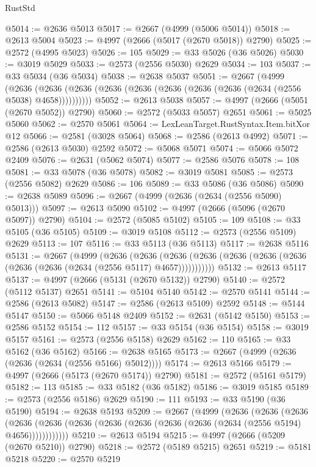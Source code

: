 \begin{lexlean}{RustStd}
\begin{coremodule}
@5014 := @2636 @5013
@5017 := @2667 (@4999 (@5006 @5014))
@5018 := @2613 @5004
@5023 := @4997 (@2666 (@5017 (@2670 @5018)) @2790)
@5025 := @2572 (@4995 @5023)
@5026 := 105
@5029 := @33 @5026 (@36 @5026)
@5030 := @3019 @5029
@5033 := @2573 (@2556 @5030) @2629
@5034 := 103
@5037 := @33 @5034 (@36 @5034)
@5038 := @2638 @5037
@5051 := @2667
    (@4999
      (@2636 (@2636 (@2636 (@2636 (@2636 (@2636 (@2636 (@2636 (@2634 (@2556 @5038) @4658))))))))))
@5052 := @2613 @5038
@5057 := @4997 (@2666 (@5051 (@2670 @5052)) @2790)
@5060 := @2572 (@5033 @5057) @2651
@5061 := @5025 @5060
@5062 := @2570 @5061
@5064 := LexLeanTarget.RustSyntax.Item.bitXor @12
@5066 := @2581 (@3028 @5064)
@5068 := @2586 (@2613 @4992)
@5071 := @2586 (@2613 @5030) @2592
@5072 := @5068 @5071
@5074 := @5066 @5072 @2409
@5076 := @2631 (@5062 @5074)
@5077 := @2586 @5076
@5078 := 108
@5081 := @33 @5078 (@36 @5078)
@5082 := @3019 @5081
@5085 := @2573 (@2556 @5082) @2629
@5086 := 106
@5089 := @33 @5086 (@36 @5086)
@5090 := @2638 @5089
@5096 := @2667 (@4999 (@2636 (@2634 (@2556 @5090) @5013)))
@5097 := @2613 @5090
@5102 := @4997 (@2666 (@5096 (@2670 @5097)) @2790)
@5104 := @2572 (@5085 @5102)
@5105 := 109
@5108 := @33 @5105 (@36 @5105)
@5109 := @3019 @5108
@5112 := @2573 (@2556 @5109) @2629
@5113 := 107
@5116 := @33 @5113 (@36 @5113)
@5117 := @2638 @5116
@5131 := @2667
    (@4999
      (@2636
        (@2636
          (@2636 (@2636 (@2636 (@2636 (@2636 (@2636 (@2636 (@2634 (@2556 @5117) @4657)))))))))))
@5132 := @2613 @5117
@5137 := @4997 (@2666 (@5131 (@2670 @5132)) @2790)
@5140 := @2572 (@5112 @5137) @2651
@5141 := @5104 @5140
@5142 := @2570 @5141
@5144 := @2586 (@2613 @5082)
@5147 := @2586 (@2613 @5109) @2592
@5148 := @5144 @5147
@5150 := @5066 @5148 @2409
@5152 := @2631 (@5142 @5150)
@5153 := @2586 @5152
@5154 := 112
@5157 := @33 @5154 (@36 @5154)
@5158 := @3019 @5157
@5161 := @2573 (@2556 @5158) @2629
@5162 := 110
@5165 := @33 @5162 (@36 @5162)
@5166 := @2638 @5165
@5173 := @2667 (@4999 (@2636 (@2636 (@2634 (@2556 @5166) @5012))))
@5174 := @2613 @5166
@5179 := @4997 (@2666 (@5173 (@2670 @5174)) @2790)
@5181 := @2572 (@5161 @5179)
@5182 := 113
@5185 := @33 @5182 (@36 @5182)
@5186 := @3019 @5185
@5189 := @2573 (@2556 @5186) @2629
@5190 := 111
@5193 := @33 @5190 (@36 @5190)
@5194 := @2638 @5193
@5209 := @2667
    (@4999
      (@2636
        (@2636
          (@2636
            (@2636 (@2636 (@2636 (@2636 (@2636 (@2636 (@2636 (@2634 (@2556 @5194) @4656))))))))))))
@5210 := @2613 @5194
@5215 := @4997 (@2666 (@5209 (@2670 @5210)) @2790)
@5218 := @2572 (@5189 @5215) @2651
@5219 := @5181 @5218
@5220 := @2570 @5219

\end{coremodule}
\end{lexlean}
